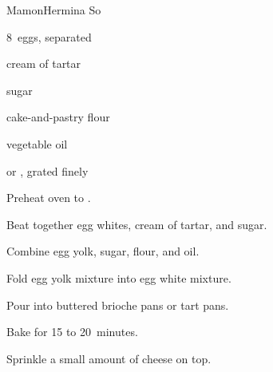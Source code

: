 \begin{recipe}{Mamon}{Hermina So}{}

\begin{ingredients}
\item 8~eggs, separated
\item \tp{\half} cream of tartar
\item \C{1\twothird} sugar
\item {} cake-and-pastry flour
\item \C{\half} vegetable oil
\item {} or , grated finely
\end{ingredients}

\begin{directions}
\item Preheat oven to .
\item Beat together egg whites, cream of tartar, and \C{\twothird} sugar.
\item Combine egg yolk,  sugar, flour, and oil.
\item Fold egg yolk mixture into egg white mixture.
\item Pour into buttered brioche pans or tart pans.
\item Bake for 15 to 20~minutes.
\item Sprinkle a small amount of cheese on top.
\end{directions}

\end{recipe}
